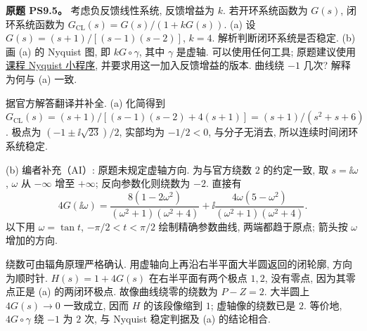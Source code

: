 \begin{exercise}
\textbf{原题 PS9.5。}\label{ass:ps9-5}
考虑负反馈线性系统, 反馈增益为 $k$. 若开环系统函数为 $G(s)$, 闭环系统函数为 $G_{\mathrm{CL}}(s)=G(s)/(1+kG(s))$.
(a) 设 $G(s)=(s+1)/[(s-1)(s-2)]$, $k=4$. 解析判断闭环系统是否稳定.
(b) 画 (a) 的 Nyquist 图, 即 $kG\circ\gamma$, 其中 $\gamma$ 是虚轴. 可以使用任何工具; 原题建议使用\href{https://web.mit.edu/jorloff/www/jmoapplets/nyquist/nyquistCrit.html}{课程 Nyquist 小程序}, 并要求用这一加入反馈增益的版本. 曲线绕 $-1$ 几次? 解释为何与 (a) 一致.
\end{exercise}
\begin{solution}
据官方解答翻译并补全.
(a) 化简得到
$G_{\mathrm{CL}}(s)=(s+1)/[(s-1)(s-2)+4(s+1)]=(s+1)/(s^2+s+6)$.
极点为 $(-1\pm\ii\sqrt{23})/2$, 实部均为 $-1/2<0$, 与分子无消去, 所以连续时间闭环系统稳定.

(b) 编者补充（AI）: 原题未规定虚轴方向. 为与官方绕数 $2$ 的约定一致, 取 $s=\ii\omega$, $\omega$ 从 $-\infty$ 增至 $+\infty$; 反向参数化则绕数为 $-2$.
直接有
\[
 4G(\ii\omega)=
 \frac{8(1-2\omega^2)}{(\omega^2+1)(\omega^2+4)}
 +\ii\frac{4\omega(5-\omega^2)}{(\omega^2+1)(\omega^2+4)}.
\]
以下用 $\omega=\tan t$, $-\pi/2<t<\pi/2$ 绘制精确参数曲线, 两端都趋于原点; 箭头按 $\omega$ 增加的方向.
\begin{center}
\end{center}
绕数可由辐角原理严格确认. 用虚轴向上再沿右半平面大半圆返回的闭轮廓, 方向为顺时针. $H(s)=1+4G(s)$ 在右半平面有两个极点 $1,2$, 没有零点, 因为其零点正是 (a) 的两闭环极点. 故像曲线绕零的绕数为 $P-Z=2$. 大半圆上 $4G(s)\to0$ 一致成立, 因而 $H$ 的该段像缩到 $1$; 虚轴像的绕数已是 $2$. 等价地, $4G\circ\gamma$ 绕 $-1$ 为 $2$ 次, 与 Nyquist 稳定判据及 (a) 的结论相合.
\end{solution}

